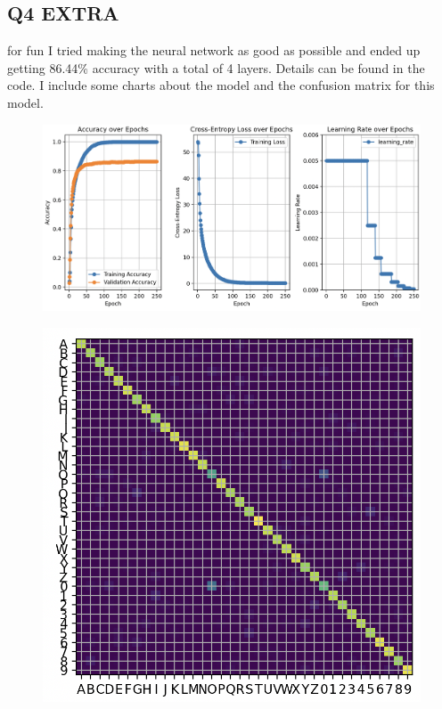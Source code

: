 \documentclass{article}
\begin{document}
\subsection*{Q4 EXTRA}
\begin{flushleft}
    for fun I tried making the neural network as good as possible and ended up getting 86.44\% 
    accuracy with a total of 4 layers. Details can be found in the code. I include some charts 
    about the model and the confusion matrix for this model.
\end{flushleft}
\begin{figure}[htbp]
    \centering
    \includegraphics[width=0.9\linewidth]{extra_model_data.png}
  \end{figure}
  \begin{figure}[htbp]
    \centering
    \includegraphics[width=0.6\linewidth]{extra_conf_mat.png}
  \end{figure}


\newpage
\end{document}

